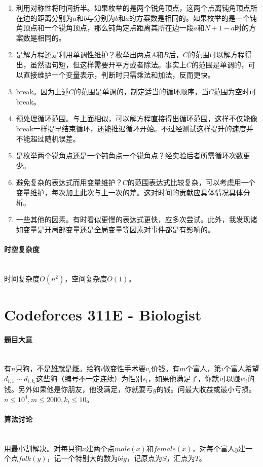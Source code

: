 \documentclass[UTF8]{ctexart}
\newcommand{\myparagraph}[1]{\paragraph{#1}\mbox{}\\}
\theoremstyle{nonumberplain}
\begin{document}
			\begin{enumerate}
				\item 利用对称性将时间折半。如果枚举的是两个锐角顶点，这两个点离钝角顶点所在边的距离分别为$a$和$b$与分别为$b$和$a$的方案数是相同的。如果枚举的是一个钝角顶点和一个锐角顶点，那么钝角定点距离其所在边一段$a$和$N+1-a$时的方案数是相同的。
				\item 是解方程还是利用单调性维护？枚举出两点$A$和$B$后，$C$的范围可以解方程得出，虽然语句短，但这样需要开平方或者除法。事实上$C$的范围是单调的，可以直接维护一个变量表示，判断时只需乘法和加法，反而更快。
				\item break。因为上述$C$的范围是单调的，制定适当的循环顺序，当$C$范围为空时可break。
				\item 预处理循环范围。与上面相似，可以解方程直接得出循环范围，这样不仅能像break一样提早结束循环，还能推迟循环开始。不过经测试这样提升的速度并不能超过随机误差。
				\item 是枚举两个锐角点还是一个钝角点一个锐角点？经实验后者所需循环次数更少。
				\item 避免复杂的表达式而用变量维护？$C$的范围表达式比较复杂，可以考虑用一个变量维护，每次加上此次与上一次的差。这对时间的贡献应具体情况具体分析。
				\item 一些其他的因素。有时看似更慢的表达式更快，应多次尝试。此外，我发现诸如变量是开局部变量还是全局变量等因素对事件都是有影响的。
				
			\end{enumerate}
		
		\myparagraph{时空复杂度}
		
			时间复杂度$O(n^2)$，空间复杂度$O(1)$。
	
	\section{Codeforces 311E - Biologist}
	
		\myparagraph{题目大意}
		
			有$n$只狗，不是雄就是雌。给狗$i$做变性手术要$v_i$价钱。有$m$个富人，第$i$个富人希望$d_{i,1} \sim d_{i,k_i}$这些狗（编号不一定连续）为性别$s_i$，如果他满足了，你就可以赚$w_i$的钱。另外如果他是你朋友，他没满足，你就要亏$g$的钱。问最大收益或最小亏损。$n \leq 10^4, m \leq 2000, k_i \leq 10$。
		
		\myparagraph{算法讨论}
		
			用最小割解决。对每只狗$x$建两个点$male(x)$和$female(x)$，对每个富人$y$建一个点$folk(y)$，记一个特别大的数为$big$，记原点为$S$，汇点为$T$。
			
\end{document}
